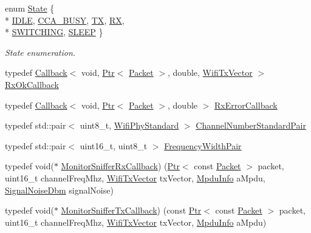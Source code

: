 \begin{DoxyCompactItemize}
\item 
enum \hyperlink{classns3_1_1WifiPhy_af97408fa76f99797497b492758467143}{State} \{ \\*
\hyperlink{classns3_1_1WifiPhy_af97408fa76f99797497b492758467143ab82b721cfd612ae187d78ffc812c567d}{I\+D\+LE}, 
\hyperlink{classns3_1_1WifiPhy_af97408fa76f99797497b492758467143aaec7a6711c1e391040d923fc0efcc849}{C\+C\+A\+\_\+\+B\+U\+SY}, 
\hyperlink{classns3_1_1WifiPhy_af97408fa76f99797497b492758467143a69db14ff4bed82ca0242f8b09065ff09}{TX}, 
\hyperlink{classns3_1_1WifiPhy_af97408fa76f99797497b492758467143a7c7899649be8e296e8907e47aacf148e}{RX}, 
\\*
\hyperlink{classns3_1_1WifiPhy_af97408fa76f99797497b492758467143a2d51e3db3a961114a197a35838adeee5}{S\+W\+I\+T\+C\+H\+I\+NG}, 
\hyperlink{classns3_1_1WifiPhy_af97408fa76f99797497b492758467143ad77ab37fb7a2710222a92a3b81d23b65}{S\+L\+E\+EP}
 \}\begin{DoxyCompactList}\small\item\em State enumeration. \end{DoxyCompactList}
\item 
typedef \hyperlink{classns3_1_1Callback}{Callback}$<$ void, \hyperlink{classns3_1_1Ptr}{Ptr}$<$ \hyperlink{classns3_1_1Packet}{Packet} $>$, double, \hyperlink{classns3_1_1WifiTxVector}{Wifi\+Tx\+Vector} $>$ \hyperlink{classns3_1_1WifiPhy_a8fc4f4e9b9bd7ef70dd8b050ae2e3188}{Rx\+Ok\+Callback}
\item 
typedef \hyperlink{classns3_1_1Callback}{Callback}$<$ void, \hyperlink{classns3_1_1Ptr}{Ptr}$<$ \hyperlink{classns3_1_1Packet}{Packet} $>$, double $>$ \hyperlink{classns3_1_1WifiPhy_af6e035a7c603eec7eae9b9365b13742e}{Rx\+Error\+Callback}
\item 
typedef std\+::pair$<$ uint8\+\_\+t, \hyperlink{group__wifi_ga1299834f4e1c615af3ca738033b76a49}{Wifi\+Phy\+Standard} $>$ \hyperlink{classns3_1_1WifiPhy_ad473141d47142c2df4a109bc559d6d50}{Channel\+Number\+Standard\+Pair}
\item 
typedef std\+::pair$<$ uint16\+\_\+t, uint8\+\_\+t $>$ \hyperlink{classns3_1_1WifiPhy_abb7b47ebed22c2703bcc239729d1e40c}{Frequency\+Width\+Pair}
\item 
typedef void($\ast$ \hyperlink{classns3_1_1WifiPhy_a3bfbe4d94e53d23626b60bb3b2f80e37}{Monitor\+Sniffer\+Rx\+Callback}) (\hyperlink{classns3_1_1Ptr}{Ptr}$<$ const \hyperlink{classns3_1_1Packet}{Packet} $>$ packet, uint16\+\_\+t channel\+Freq\+Mhz, \hyperlink{classns3_1_1WifiTxVector}{Wifi\+Tx\+Vector} tx\+Vector, \hyperlink{structns3_1_1MpduInfo}{Mpdu\+Info} a\+Mpdu, \hyperlink{structns3_1_1SignalNoiseDbm}{Signal\+Noise\+Dbm} signal\+Noise)
\item 
typedef void($\ast$ \hyperlink{classns3_1_1WifiPhy_a34ea6a73f51ab1ab236211e44bae14e4}{Monitor\+Sniffer\+Tx\+Callback}) (const \hyperlink{classns3_1_1Ptr}{Ptr}$<$ const \hyperlink{classns3_1_1Packet}{Packet} $>$ packet, uint16\+\_\+t channel\+Freq\+Mhz, \hyperlink{classns3_1_1WifiTxVector}{Wifi\+Tx\+Vector} tx\+Vector, \hyperlink{structns3_1_1MpduInfo}{Mpdu\+Info} a\+Mpdu)
\end{DoxyCompactItemize}
